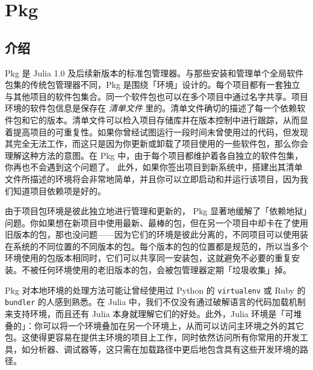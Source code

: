 \hypertarget{16222174321033129856}{}


\chapter{Pkg}



\hypertarget{7253998760451691688}{}


\section{介绍}



Pkg 是 Julia 1.0 及后续新版本的标准包管理器。与那些安装和管理单个全局软件包集的传统包管理器不同，Pkg 是围绕「环境」设计的。每个项目都有一套独立与其他项目的软件包集合。同一个软件包也可以在多个项目中通过名字共享。项目环境的软件包信息是保存在 \emph{清单文件} 里的。清单文件确切的描述了每一个依赖软件包和它的版本。清单文件可以检入项目存储库并在版本控制中进行跟踪，从而显着提高项目的可重复性。如果你曾经试图运行一段时间未曾使用过的代码，但发现其完全无法工作，而这只是因为你更新或卸载了项目使用的一些软件包，那么你会理解这种方法的意图。在 Pkg 中，由于每个项目都维护着各自独立的软件包集，你再也不会遇到这个问题了。 此外，如果你签出项目到新系统中，搭建出其清单文件所描述的环境将会非常地简单，并且你可以立即启动和并运行该项目，因为我们知道项目依赖项是好的。



由于项目包环境是彼此独立地进行管理和更新的， Pkg 显著地缓解了「依赖地狱」问题。你如果想在新项目中使用最新、最棒的包，但在另一个项目中却卡在了使用旧版本的包，那也没问题——因为它们的环境是彼此分离的，不同项目可以使用装在系统的不同位置的不同版本的包。每个版本的包的位置都是规范的，所以当多个环境使用的包版本相同时，它们可以共享同一安装包，这就避免不必要的重复安装。不被任何环境使用的老旧版本的包，会被包管理器定期「垃圾收集」掉。



Pkg 对本地环境的处理方法可能让曾经使用过 Python 的 \texttt{virtualenv} 或 Ruby 的 \texttt{bundler} 的人感到熟悉。在 Julia 中，我们不仅没有通过破解语言的代码加载机制来支持环境，而且还有 Julia 本身就理解它们的好处。此外，Julia 环境是「可堆叠的」：你可以将一个环境叠加在另一个环境上，从而可以访问主环境之外的其它包。这使得更容易在提供主环境的项目上工作，同时依然访问所有你常用的开发工具，如分析器、调试器等，这只需在加载路径中更后地包含具有这些开发环境的路径。



